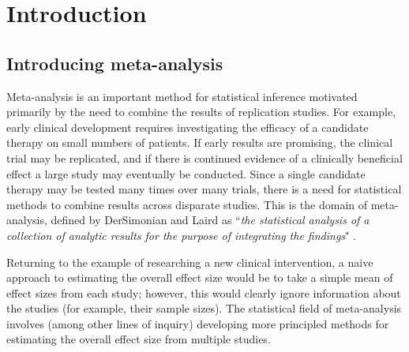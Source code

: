 \documentclass[fleqn,10pt]{SelfArx} %
\begin{document}
\flushbottom %

\maketitle %

\tableofcontents %

\thispagestyle{empty} %


\section{Introduction} %

\subsection*{Introducing meta-analysis}

Meta-analysis is an important method for statistical inference motivated primarily by the need to combine the results of replication studies. For example, early clinical development requires investigating the efficacy of a candidate therapy on small numbers of patients. If early results are promising, the clinical trial may be replicated, and if there is continued evidence of a clinically beneficial effect a large study may eventually be conducted. Since a single candidate therapy may be tested many times over many trials, there is a need for statistical methods to combine results across disparate studies. This is the domain of meta-analysis, defined by DerSimonian and Laird as ``\emph{the statistical analysis of a collection of analytic results for the purpose of integrating the findings}" \cite{DL}.

Returning to the example of researching a new clinical intervention, a naive approach to estimating the overall effect size would be to take a simple mean of effect sizes from each study; however, this would clearly ignore information about the studies (for example, their sample sizes). The statistical field of meta-analysis involves (among other lines of inquiry) developing more principled methods for estimating the overall effect size from multiple studies.
\end{document}
